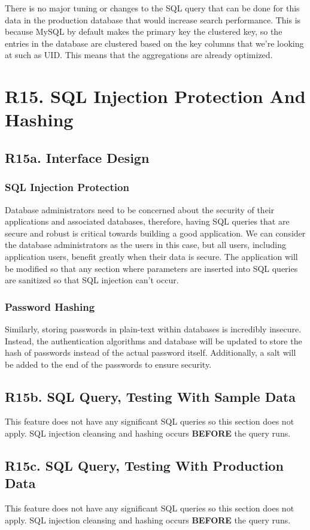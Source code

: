 \documentclass[12pt, a4paper]{article}
\begin{document}
There is no major tuning or changes to the SQL query that can be done for this data in the production database that would increase search performance. This is because MySQL by default makes the primary key the clustered key, so the entries in the database are clustered based on the key columns that we're looking at such as UID. This means that the aggregations are already optimized.
\section*{R15. SQL Injection Protection And Hashing}
\label{sec:R15}
\subsection*{R15a. Interface Design}
\subsubsection*{SQL Injection Protection}
Database administrators need to be concerned about the security of their applications and associated databases, therefore, having SQL queries that are secure and robust is critical towards building a good application. We can consider the database administrators as the users in this case, but all users, including application users, benefit greatly when their data is secure. The application will be modified so that any section where parameters are inserted into SQL queries are sanitized so that SQL injection can't occur.
\subsubsection*{Password Hashing}
Similarly, storing passwords in plain-text within databases is incredibly insecure. Instead, the authentication algorithms and database will be updated to store the hash of passwords instead of the actual password itself. Additionally, a salt will be added to the end of the passwords to ensure security. 
\subsection*{R15b. SQL Query, Testing With Sample Data}
This feature does not have any significant SQL queries so this section does not apply. SQL injection cleansing and hashing occurs \textbf{BEFORE} the query runs.
\subsection*{R15c. SQL Query, Testing With Production Data}
This feature does not have any significant SQL queries so this section does not apply. SQL injection cleansing and hashing occurs \textbf{BEFORE} the query runs.
\end{document}
